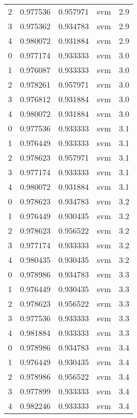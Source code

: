 \begin{tabular}{rrrlr}
     2 & 0.977536 & 0.957971 &      svm &        2.9 \\
     3 & 0.975362 & 0.934783 &      svm &        2.9 \\
     4 & 0.980072 & 0.931884 &      svm &        2.9 \\
     0 & 0.977174 & 0.933333 &      svm &        3.0 \\
     1 & 0.976087 & 0.933333 &      svm &        3.0 \\
     2 & 0.978261 & 0.957971 &      svm &        3.0 \\
     3 & 0.976812 & 0.931884 &      svm &        3.0 \\
     4 & 0.980072 & 0.931884 &      svm &        3.0 \\
     0 & 0.977536 & 0.933333 &      svm &        3.1 \\
     1 & 0.976449 & 0.933333 &      svm &        3.1 \\
     2 & 0.978623 & 0.957971 &      svm &        3.1 \\
     3 & 0.977174 & 0.933333 &      svm &        3.1 \\
     4 & 0.980072 & 0.931884 &      svm &        3.1 \\
     0 & 0.978623 & 0.934783 &      svm &        3.2 \\
     1 & 0.976449 & 0.930435 &      svm &        3.2 \\
     2 & 0.978623 & 0.956522 &      svm &        3.2 \\
     3 & 0.977174 & 0.933333 &      svm &        3.2 \\
     4 & 0.980435 & 0.930435 &      svm &        3.2 \\
     0 & 0.978986 & 0.934783 &      svm &        3.3 \\
     1 & 0.976449 & 0.930435 &      svm &        3.3 \\
     2 & 0.978623 & 0.956522 &      svm &        3.3 \\
     3 & 0.977536 & 0.933333 &      svm &        3.3 \\
     4 & 0.981884 & 0.933333 &      svm &        3.3 \\
     0 & 0.978986 & 0.934783 &      svm &        3.4 \\
     1 & 0.976449 & 0.930435 &      svm &        3.4 \\
     2 & 0.978986 & 0.956522 &      svm &        3.4 \\
     3 & 0.977899 & 0.933333 &      svm &        3.4 \\
     4 & 0.982246 & 0.933333 &      svm &        3.4 \\

\end{tabular}
